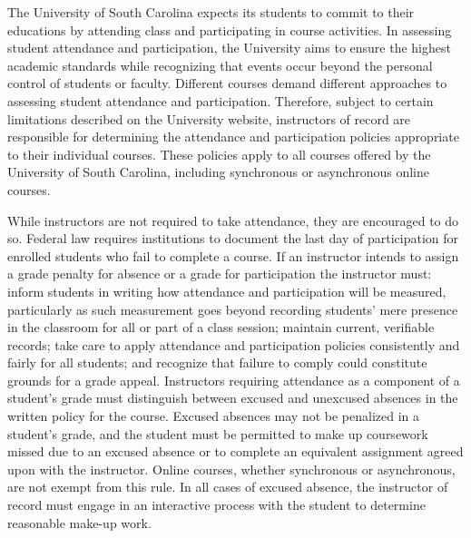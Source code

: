 \documentclass[11pt,letterpaper]{article}
\begin{document}
\newpage






The University of South Carolina expects its students to commit to their educations by attending class and participating in course activities. In assessing student attendance and participation, the University aims to ensure the highest academic standards while recognizing that events occur beyond the personal control of students or faculty. Different courses demand different approaches to assessing student attendance and participation. Therefore, subject to certain limitations described on the University website, instructors of record are responsible for determining the attendance and participation policies appropriate to their individual courses. These policies apply to all courses offered by the University of South Carolina, including synchronous or asynchronous online courses. \pspace

While instructors are not required to take attendance, they are encouraged to do so. Federal law requires institutions to document the last day of participation for enrolled students who fail to complete a course. If an instructor intends to assign a grade penalty for absence or a grade for participation the instructor must: inform students in writing how attendance and participation will be measured, particularly as such measurement goes beyond recording students' mere presence in the classroom for all or part of a class session; maintain current, verifiable records; take care to apply attendance and participation policies consistently and fairly for all students; and recognize that failure to comply could constitute grounds for a grade appeal. Instructors requiring attendance as a component of a student’s grade must distinguish between excused and unexcused absences in the written policy for the course. Excused absences may not be penalized in a student’s grade, and the student must be permitted to make up coursework missed due to an excused absence or to complete an equivalent assignment agreed upon with the instructor. Online courses, whether synchronous or asynchronous, are not exempt from this rule. In all cases of excused absence, the instructor of record must engage in an interactive process with the student to determine reasonable make-up work. \pspace
\end{document}

